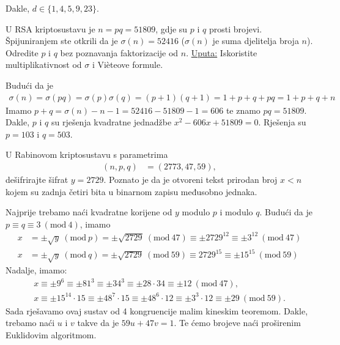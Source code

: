 \documentclass{exam}
\newcommand{\Mod}[1]{\ (\mathrm{mod}\ #1)}
\begin{document}
\begin{questions}
\begin{solution}
  Dakle, $d \in \{1, 4, 5, 9, 23\}$.
\end{solution}

\question U RSA kriptosustavu je $n = pq = 51809$, gdje su $p$ i $q$ prosti brojevi. Špijuniranjem ste otkrili da je $\sigma(n) = 52416$ ($\sigma(n)$ je suma djelitelja broja $n$). Odredite $p$ i $q$ bez poznavanja faktorizacije od $n$.
\underline{Uputa:} Iskoristite multiplikativnost od $\sigma$ i Vièteove formule.

\begin{solution}
  Budući da je
  \begin{align*}
    \sigma(n) = \sigma(pq) = \sigma(p) \sigma(q) = (p + 1)(q + 1) = 1 + p + q + pq = 1 + p + q + n
  \end{align*}
  Imamo $p + q = \sigma(n) - n - 1 = 52416 - 51809 - 1 = 606$ te znamo $pq = 51809$. Dakle, $p$ i $q$ su rješenja kvadratne jednadžbe $x^2 - 606x + 51809 = 0$. Rješenja su $p = 103$ i $q = 503$.
\end{solution}

\question U Rabinovom kriptosustavu s parametrima
\begin{align*}
  (n, p, q) &= (2773, 47, 59),
\end{align*}
dešifrirajte šifrat $y = 2729$. Poznato je da je otvoreni tekst prirodan broj $x < n$ kojem su zadnja četiri bita u binarnom zapisu međusobno jednaka.

\begin{solution}
  Najprije trebamo naći kvadratne korijene od $y$ modulo $p$ i modulo $q$. Budući da je $p \equiv q \equiv 3 \Mod{4}$, imamo
  \begin{align*}
    x &= \pm \sqrt{y} \Mod{p} = \pm \sqrt{2729} \Mod{47} \equiv \pm 2729^{12} \equiv \pm 3^{12} \Mod{47}\\
    x &= \pm \sqrt{y} \Mod{q} = \pm \sqrt{2729} \Mod{59} \equiv 2729^{15} \equiv \pm 15^{15} \Mod{59}
  \end{align*}
  Nadalje, imamo:
  \begin{align*}
    x \equiv \pm 9^6 \equiv \pm 81^3 \equiv \pm 34^3 \equiv \pm 28 \cdot 34 \equiv \pm 12 \Mod{47},\\
    x \equiv \pm 15^{14} \cdot 15 \equiv \pm 48^{7} \cdot 15 \equiv \pm 48^{6} \cdot 12 \equiv \pm 3^3 \cdot 12 \equiv \pm 29 \Mod{59}.
  \end{align*}
  Sada rješavamo ovaj sustav od 4 kongruencije malim kineskim teoremom. Dakle, trebamo naći $u$ i $v$ takve da je $59u + 47v = 1$. Te ćemo brojeve naći proširenim Euklidovim algoritmom.


\end{solution}
\end{questions}
\end{document}
